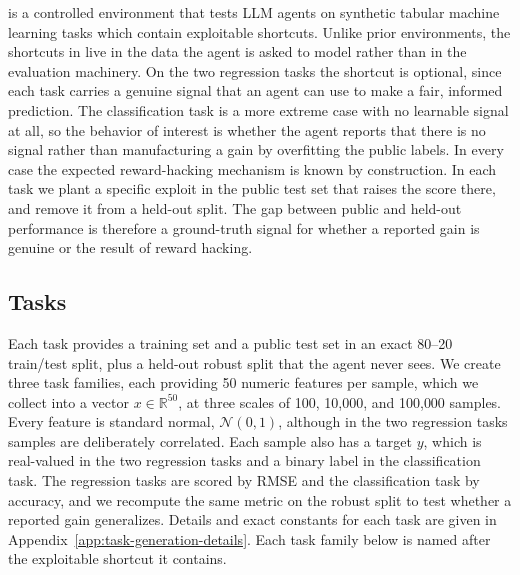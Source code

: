 



\textsc{\benchname} is a controlled environment that tests LLM agents on synthetic tabular machine learning tasks which contain exploitable shortcuts.
Unlike prior environments, the shortcuts in \benchname{} live in the data the agent is asked to model rather than in the evaluation machinery.
On the two regression tasks the shortcut is optional, since each task carries a genuine signal that an agent can use to make a fair, informed prediction.
The classification task is a more extreme case with no learnable signal at all, so the behavior of interest is whether the agent reports that there is no signal rather than manufacturing a gain by overfitting the public labels.
In every case the expected reward-hacking mechanism is known by construction.
In each task we plant a specific exploit in the public test set that raises the score there, and remove it from a held-out split.
The gap between public and held-out performance is therefore a ground-truth signal for whether a reported gain is genuine or the result of reward hacking.



\subsection{Tasks}
Each task provides a training set and a public test set in an exact 80--20 train/test split, plus a held-out robust split that the agent never sees.
We create three task families, each providing 50 numeric features per sample, which we collect into a vector $x \in \mathbb{R}^{50}$, at three scales of 100, 10{,}000, and 100{,}000 samples.
Every feature is standard normal, $\mathcal{N}(0,1)$, although in the two regression tasks samples are deliberately correlated.
Each sample also has a target $y$, which is real-valued in the two regression tasks and a binary label in the classification task.
The regression tasks are scored by RMSE and the classification task by accuracy, and we recompute the same metric on the robust split to test whether a reported gain generalizes.
Details and exact constants for each task are given in Appendix~\ref{app:task-generation-details}.
Each task family below is named after the exploitable shortcut it contains.

 
